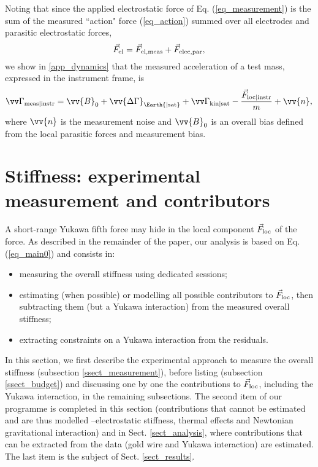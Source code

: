 \documentclass[12pt]{iopart}
\begin{document}
Noting that since the applied electrostatic force of Eq. (\ref{eq_measurement}) is the sum of the measured ``action" force (\ref{eq_action}) summed over all electrodes and parasitic electrostatic forces,
\begin{equation}
\vec{F}_{\rm el} = \vec{F}_{\rm el, meas} + \vec{F}_{\rm elec, par},
\end{equation}
we show in \ref{app_dynamics} that the measured acceleration of a test mass, expressed in the instrument frame, is
\begin{equation} \label{eq_main0}
\vv\Gamma_{\rm meas | instr} = \vv{B}_{0} + \vv{\Delta\Gamma}_{\Earth {\rm | sat}} + \vv\Gamma_{\rm kin | sat} - \frac{\vec{F}_{\rm loc | instr}}{m} + \vv{n},
\end{equation}
where $\vv{n}$ is the measurement noise and $\vv{B}_{0}$ is an overall bias defined from the local parasitic forces and measurement bias. %





\section{Stiffness: experimental measurement and contributors}  \label{sect_forces}

A short-range Yukawa fifth force may hide in the local component $\vec{F}_{\rm loc}$ of the force. As described in the remainder of the paper, our analysis is based on Eq. (\ref{eq_main0}) and consists in:
\begin{itemize}
\item measuring the overall stiffness using dedicated sessions;
\item estimating (when possible) or modelling all possible contributors to $\vec{F}_{\rm loc}$, then subtracting them (but a Yukawa interaction) from the measured overall stiffness;
\item extracting constraints on a Yukawa interaction from the residuals.
\end{itemize}

In this section, we first describe the experimental approach to measure the overall stiffness (subsection \ref{ssect_measurement}), before listing (subsection \ref{ssect_budget}) and discussing one by one the contributions to $\vec{F}_{\rm loc}$, including the Yukawa interaction, in the remaining subsections.
The second item of our programme is completed in this section (contributions that cannot be estimated and are thus modelled --electrostatic stiffness, thermal effects and Newtonian gravitational interaction) and in Sect. \ref{sect_analysis}, where contributions that can be extracted from the data (gold wire and Yukawa interaction) are estimated.
The last item is the subject of Sect. \ref{sect_results}.
\end{document}
